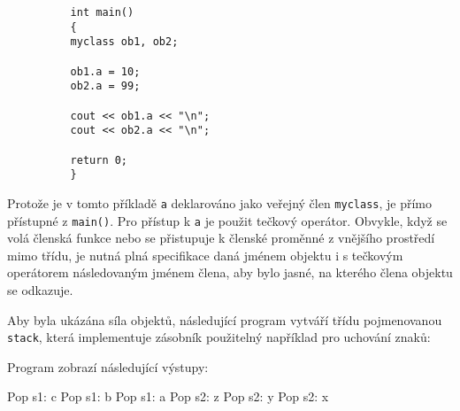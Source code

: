 {\begin{example}
\begin{lstlisting}
          int main()
          {
          myclass ob1, ob2;
  
          ob1.a = 10;
          ob2.a = 99;
  
          cout << ob1.a << "\n";
          cout << ob2.a << "\n";
  
          return 0;
          }
          \end{lstlisting}
        Protože je v tomto příkladě \lstinline[basicstyle=\ttfamily]!a! deklarováno jako veřejný 
        člen \lstinline[basicstyle=\ttfamily]!myclass!, je přímo přístupné z 
        \lstinline[basicstyle=\ttfamily]!main()!. Pro přístup k \lstinline[basicstyle=\ttfamily]!a! 
        je použit tečkový operátor. Obvykle, když se volá členská funkce nebo se přistupuje k 
        členské proměnné z vnějšího prostředí mimo třídu, je nutná plná specifikace daná jménem 
        objektu i s tečkovým operátorem následovaným jménem člena, aby bylo jasné, na kterého člena 
        objektu se odkazuje.
      \end{example}
  
      \begin{example}\label{stack1}
        Aby byla ukázána síla objektů, následující program vytváří třídu pojmenovanou 
        \lstinline[basicstyle=\ttfamily]!stack!, která implementuje zásobník použitelný například 
        pro uchování znaků:
        
        Program zobrazí následující výstupy:
        \begin{center}
        Pop s1: c\linebreak
        Pop s1: b\linebreak
        Pop s1: a\linebreak
        Pop s2: z\linebreak
        Pop s2: y\linebreak
        Pop s2: x
        \end{center}
  

\end{example}}

